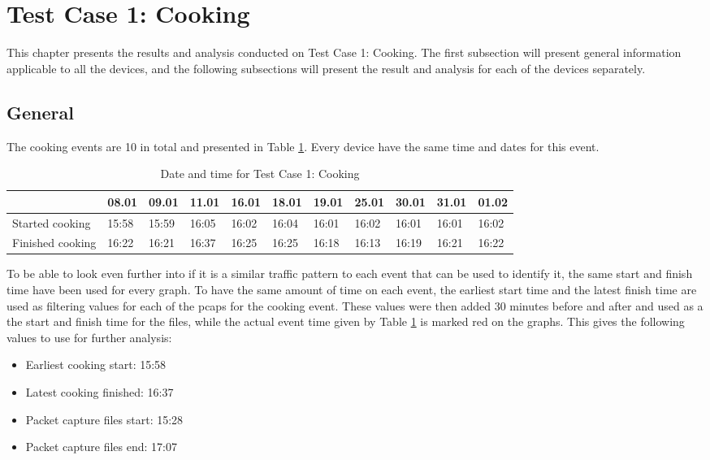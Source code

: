 \newpage
\section{Test Case 1: Cooking}
This chapter presents the results and analysis conducted on Test Case 1: Cooking. The first subsection will present general information applicable to all the devices, and the following subsections will present the result and analysis for each of the devices separately. 
\subsection{General}
The cooking events are 10 in total and presented in Table \ref{tab:CookingDates}. Every device have the same time and dates for this event. 
\begin{table}[H]
    \centering
    \caption{Date and time for Test Case 1: Cooking}
    \begin{adjustbox}{width=1\textwidth}
            \begin{tabular}{l|l|l|l|l|l|l|l|l|l|l|}
            \cline{2-11} & 08.01 & 09.01 & 11.01 & 16.01 & 18.01 & 19.01 & 25.01 & 30.01 & 31.01 & 01.02 \\
            \hline
            \multicolumn{1}{|l|}{Started cooking}  & 15:58 & 15:59 & 16:05 & 16:02 & 16:04 & 16:01 & 16:02 & 16:01 & 16:01 & 16:02 \\ 
            \hline
            \multicolumn{1}{|l|}{Finished cooking} & 16:22 & 16:21 & 16:37 & 16:25 & 16:25 & 16:18 & 16:13 & 16:19 & 16:21 & 16:22 \\ \hline
            \end{tabular}
    \end{adjustbox}
    \label{tab:CookingDates}
\end{table}
\FloatBarrier

To be able to look even further into if it is a similar traffic pattern to each event that can be used to identify it, the same start and finish time have been used for every graph. To have the same amount of time on each event, the earliest start time and the latest finish time are used as filtering values for each of the \gls{pcaps} for the cooking event. These values were then added 30 minutes before and after and used as a the start and finish time for the files, while the actual event time given by Table \ref{tab:CookingDates} is marked red on the graphs. This gives the following values to use for further analysis:

\begin{itemize}
    \item Earliest cooking start: 15:58
    \item Latest cooking finished: 16:37
    \item Packet capture files start: 15:28
    \item Packet capture files end: 17:07
\end{itemize}


